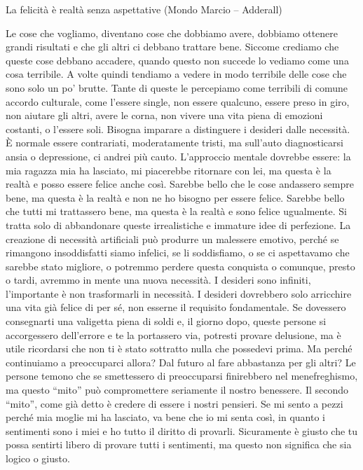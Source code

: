 \documentclass[12pt]{book} %
\begin{document}
La felicità è realtà senza aspettative (Mondo Marcio – Adderall)

Le cose che vogliamo, diventano cose che dobbiamo avere, dobbiamo ottenere grandi risultati e che gli altri ci debbano
trattare bene. Siccome crediamo che queste cose debbano accadere, quando questo non succede lo vediamo come una cosa
terribile. A volte quindi tendiamo a vedere in modo terribile delle cose che sono solo un po'
brutte. Tante di queste le percepiamo come terribili di comune accordo culturale, come l'essere
single, non essere qualcuno, essere preso in giro, non aiutare gli altri, avere le corna, non vivere una vita piena di
emozioni costanti, o l'essere soli. Bisogna imparare a distinguere i desideri dalle necessità. È
normale essere contrariati, moderatamente tristi, ma sull'auto diagnosticarsi ansia o depressione, ci andrei più cauto. L'approccio mentale dovrebbe
essere: la mia ragazza mia ha lasciato, mi piacerebbe ritornare con lei, ma questa è la realtà e posso essere felice
anche così. Sarebbe bello che le cose andassero sempre bene, ma questa è la realtà e non ne ho bisogno per essere
felice. Sarebbe bello che tutti mi trattassero bene, ma questa è la realtà e sono felice ugualmente. Si tratta solo di
abbandonare queste irrealistiche e immature idee di perfezione. La creazione di necessità artificiali può produrre un
malessere emotivo, perché se rimangono insoddisfatti siamo infelici, se li soddisfiamo, o se ci aspettavamo che sarebbe
stato migliore, o potremmo perdere questa conquista o comunque, presto o tardi, avremmo in mente una nuova necessità. I
desideri sono infiniti, l'importante è non trasformarli in necessità. I desideri dovrebbero solo
arricchire una vita già felice di per sé, non esserne il requisito fondamentale. Se
dovessero consegnarti una valigetta piena di soldi e, il giorno dopo, queste persone si accorgessero dell'errore e
te la portassero via, potresti provare delusione, ma è utile ricordarsi che non ti è stato sottratto nulla che possedevi prima. Ma perché
continuiamo a preoccuparci allora? Dal futuro al fare abbastanza per gli altri? Le persone temono che se smettessero di
preoccuparsi finirebbero nel menefreghismo, ma questo “mito” può compromettere seriamente il nostro benessere. Il
secondo “mito”, come già detto è credere di essere i nostri pensieri. Se mi sento a pezzi perché mia moglie mi ha
lasciato, va bene che io mi senta così, in quanto i sentimenti sono i miei e ho tutto il diritto di provarli. Sicuramente
è giusto che tu possa sentirti libero di provare tutti i sentimenti, ma questo non significa che sia logico o giusto.
\end{document}
